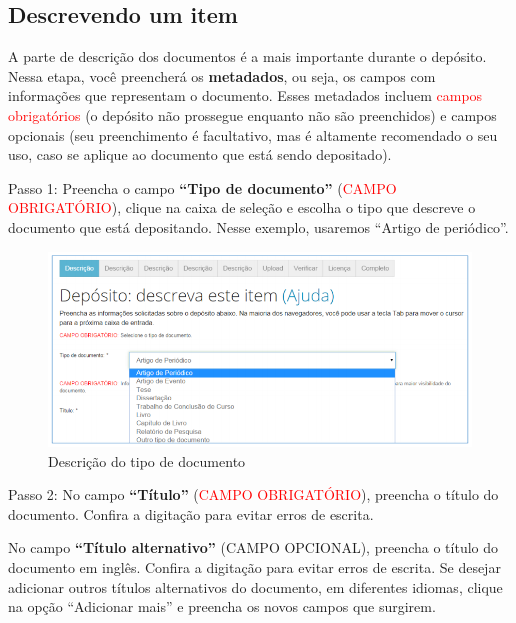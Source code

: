 \documentclass[12pt,hidelinks]{article}
\begin{document}
\newpage

    \subsection{Descrevendo um item}
    
    A parte de descrição dos documentos é a mais importante durante o depósito. Nessa etapa, você preencherá os \textbf{metadados}, ou seja, os campos com informações que representam o documento. Esses metadados incluem \textcolor{red}{campos obrigatórios} (o depósito não prossegue enquanto não são preenchidos) e \textcolor{applegreen}{campos opcionais} (seu preenchimento é facultativo, mas é altamente recomendado o seu uso, caso se aplique ao documento que está sendo depositado). 
    
    \singlespacing
    
    Passo 1: Preencha o campo \textbf{“Tipo de documento”} (\textcolor{red}{CAMPO OBRIGATÓRIO}), clique na caixa de seleção e escolha o tipo que descreve o documento que está depositando. Nesse exemplo, usaremos “Artigo de periódico”.
    
    \begin{figure}[!htp]
                \centering
                \includegraphics[scale=0.8]{figura/Figura136.png}
                \caption{Descrição do tipo de documento}
            \label{Rotulo}
        \end{figure}
    
    Passo 2: No campo \textbf{“Título”} (\textcolor{red}{CAMPO OBRIGATÓRIO}), preencha o título do documento. Confira a digitação para evitar erros de escrita.
    
    \singlespacing
    
    No campo \textbf{“Título alternativo”} (\textcolor{applegreen}{CAMPO OPCIONAL}), preencha o título do documento em inglês. Confira a digitação para evitar erros de escrita. Se desejar adicionar outros títulos alternativos do documento, em diferentes idiomas, clique na opção “Adicionar mais” e preencha os novos campos que surgirem. 
    
\end{document}
